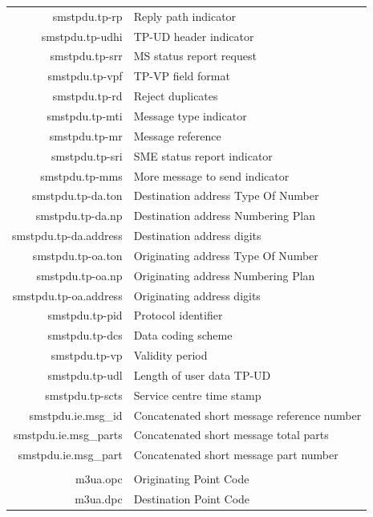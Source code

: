 \documentclass[a4paper,latin]{paper}
\begin{document}
\noindent
\begin{tabularx}{\linewidth}{ | >{\ttfamily} r | >{\ttfamily} X |}
	\hline
	\rowcolor{blue!10}
	\multicolumn{2}{| l |}{\acrfull{smstpdu}} 	\\
	\hline
	smstpdu.tp-rp					& Reply path indicator\\
	smstpdu.tp-udhi					& TP-UD header indicator\\
	smstpdu.tp-srr					& MS status report request\\
	smstpdu.tp-vpf					& TP-VP field format\\
	smstpdu.tp-rd					& Reject duplicates\\
	smstpdu.tp-mti					& Message type indicator\\
	smstpdu.tp-mr					& Message reference\\
	smstpdu.tp-sri					& SME status report indicator\\
	smstpdu.tp-mms					& More message to send indicator\\
	smstpdu.tp-da.ton				& Destination address Type Of Number\\
	smstpdu.tp-da.np				& Destination address Numbering Plan\\
	smstpdu.tp-da.address				& Destination address digits\\
	smstpdu.tp-oa.ton				& Originating address Type Of Number\\
	smstpdu.tp-oa.np				& Originating address Numbering Plan\\
	smstpdu.tp-oa.address				& Originating address digits\\
	smstpdu.tp-pid					& Protocol identifier\\
	smstpdu.tp-dcs					& Data coding scheme\\
	smstpdu.tp-vp					& Validity period\\
	smstpdu.tp-udl					& Length of user data TP-UD\\
	smstpdu.tp-scts					& Service centre time stamp\\
	smstpdu.ie.msg\_id				& Concatenated short message reference number\\
	smstpdu.ie.msg\_parts				& Concatenated short message total parts\\
	smstpdu.ie.msg\_part				& Concatenated short message part number\\
	\hline
	\rowcolor{blue!10}
	\multicolumn{2}{| l |}{\acrfull{m3ua}} 		\\
	\hline
	m3ua.opc					& Originating Point Code\\
	m3ua.dpc					& Destination Point Code\\

\end{tabularx}
\end{document}

